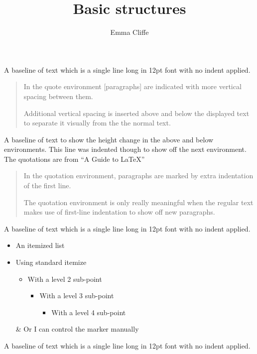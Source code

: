 \documentclass[12pt,a4paper,onecolumn]{article}
\title{Basic structures}
\author{Emma Cliffe}
\date{}
\begin{document}
\maketitle
\noindent
A baseline of text which is a single line long in 12pt font with no indent applied.

\begin{quote}
In the quote environment [paragraphs] are indicated with more vertical spacing between them. 

Additional vertical spacing is inserted above and below the displayed text to separate it visually from the the normal text.
\end{quote}

A baseline of text to show the height change in the above and below environments. This line was indented though to show off the next environment. The quotations are from ``A Guide to \LaTeX'' \cite{KopkaDaly}

\begin{quotation}
In the quotation environment, paragraphs are marked by extra indentation of the first line. 

The quotation environment is only really meaningful when the regular text makes use of first-line indentation to show off new paragraphs.
\end{quotation}


\noindent
A baseline of text which is a single line long in 12pt font with no indent applied.

\begin{itemize}
\item An itemized list
\item Using standard itemize
\begin{itemize}
\item With a level 2 sub-point
\begin{itemize}
\item With a level 3 sub-point
\begin{itemize}
\item With a level 4 sub-point
\end{itemize}
\end{itemize}
\end{itemize}
\item[\&] Or I can control the marker manually
\end{itemize}

\noindent
A baseline of text which is a single line long in 12pt font with no indent applied.
\end{document}
